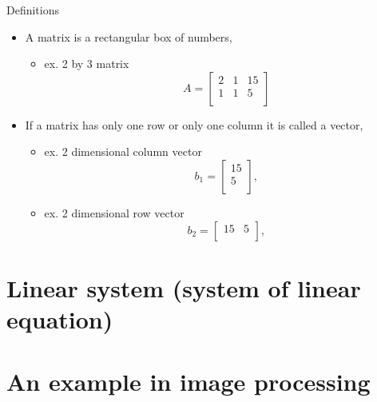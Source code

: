 \documentclass{beamer}
\theoremstyle{definition}
\theoremstyle{theorem}
\begin{document}
\begin{frame}
{Definitions}
\begin{itemize}
 \item A matrix is a rectangular box of numbers,
 \begin{itemize}
 \item ex. 2 by 3 matrix 
 $$ A = 
\begin{bmatrix}
 2 & 1 & 15\\
 1 & 1 & 5\\
 \end{bmatrix}
$$
\end{itemize}
\item If a matrix has only one row or only one column it is called a vector, 
\begin{itemize}
 \item ex. 2 dimensional column vector 
 $$ b_{1} = 
\begin{bmatrix}
 15 \\
 5  \\
 \end{bmatrix}, 
 $$
\item ex. 2 dimensional  row vector
 $$  b_{2} = 
 \begin{bmatrix}
 15 &
 5  \\
 \end{bmatrix}, 
 $$
\end{itemize} 
\end{itemize}
\end{frame}

\section{Linear system (system of linear equation)}

\section{An  example in image processing}
\end{document}
